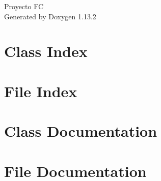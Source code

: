 \documentclass[twoside]{book}
\newcommand{\+}{\discretionary{\mbox{\scriptsize$\hookleftarrow$}}{}{}}
\newcommand{\clearemptydoublepage}{%
    \newpage{\pagestyle{empty}\cleardoublepage}%
  }
\begin{document}
  \raggedbottom
    \hypersetup{pageanchor=false,
                bookmarksnumbered=true,
                pdfencoding=unicode
               }
  \begin{titlepage}
  \vspace*{7cm}
  \begin{center}%
  {\Large Proyecto FC}\\
  \vspace*{1cm}
  {\large Generated by Doxygen 1.13.2}\\
  \end{center}
  \end{titlepage}
  \clearemptydoublepage
  \tableofcontents
  \clearemptydoublepage
  \hypersetup{pageanchor=true}
\chapter{Class Index}

\chapter{File Index}

\chapter{Class Documentation}

\chapter{File Documentation}

  \backmatter
  \newpage
  \clearemptydoublepage
  \printindex
\end{document}

